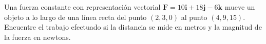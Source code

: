 \item Una fuerza constante con representación vectorial $\mathbf{F} = 10\mathbf{i} + 18\mathbf{j} - 6\mathbf{k}$ mueve un objeto a lo largo de una línea recta del punto $(2, 3, 0)$ al punto $(4, 9, 15)$. Encuentre el trabajo efectuado si la distancia se mide en metros y la magnitud de la fuerza en newtons.
